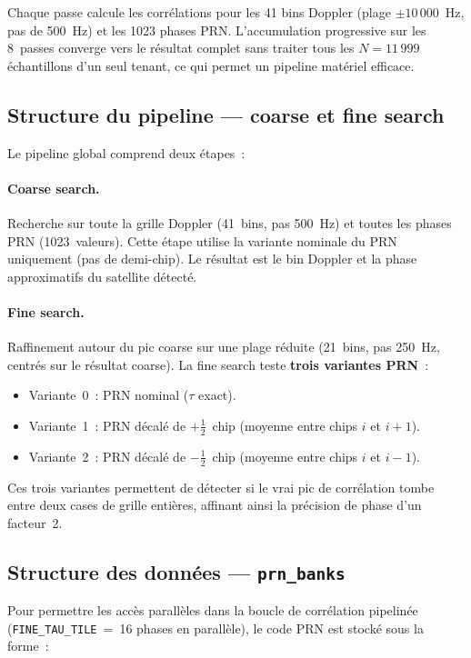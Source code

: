 \documentclass[11pt,a4paper]{article}
\begin{document}
Chaque passe calcule les corrélations pour les 41 bins Doppler (plage $\pm10\,000$~Hz, pas de 500~Hz) et les 1023 phases PRN. L'accumulation progressive sur les 8~passes converge vers le résultat complet sans traiter tous les $N=11\,999$ échantillons d'un seul tenant, ce qui permet un pipeline matériel efficace.

\subsection{Structure du pipeline --- coarse et fine search}

Le pipeline global comprend deux étapes~:

\paragraph{Coarse search.} Recherche sur toute la grille Doppler (41~bins, pas 500~Hz) et toutes les phases PRN (1023~valeurs). Cette étape utilise la variante nominale du PRN uniquement (pas de demi-chip). Le résultat est le bin Doppler et la phase approximatifs du satellite détecté.

\paragraph{Fine search.} Raffinement autour du pic coarse sur une plage réduite (21~bins, pas 250~Hz, centrés sur le résultat coarse). La fine search teste \textbf{trois variantes PRN}~:
\begin{itemize}
  \item Variante~0~: PRN nominal ($\tau$ exact).
  \item Variante~1~: PRN décalé de $+\tfrac{1}{2}$~chip (moyenne entre chips $i$ et $i+1$).
  \item Variante~2~: PRN décalé de $-\tfrac{1}{2}$~chip (moyenne entre chips $i$ et $i-1$).
\end{itemize}

Ces trois variantes permettent de détecter si le vrai pic de corrélation tombe entre deux cases de grille entières, affinant ainsi la précision de phase d'un facteur~2.

\subsection{Structure des données --- \texttt{prn\_banks}}

Pour permettre les accès parallèles dans la boucle de corrélation pipelinée (\texttt{FINE\_TAU\_TILE}~=~16 phases en parallèle), le code PRN est stocké sous la forme~:
\end{document}
